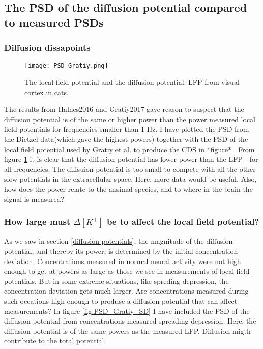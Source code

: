 \documentclass{article}
\begin{document}
\subsection{The PSD of the diffusion potential compared to measured PSDs}
\subsubsection{Diffusion dissapoints}

\begin{figure}
  \texttt{[image: PSD\_Gratiy.png]}
  \caption{The local field potential and the diffusion potential. LFP from visual cortex in cats.}
  \label{fig:PSD_Gratiy}
\end{figure}

The results from Halnes2016 and Gratiy2017 gave reason to suspect that the diffusion potential is of the same or higher power than the power measured local field potentials for frequencies smaller than 1 Hz. I have plotted the PSD from the Dietzel data(which gave the highest powers) together with the PSD of the local field potential used by Gratiy et al. to produce the CDS in *figure* . From figure \ref{fig:PSD_Gratiy} it is clear that the diffusion potential has lower power than the LFP  - for all frequencies. The diffsuion potential is too small to compete with all the other slow potentials in the extracellular space. Here, more data would be useful. Also, how does the power relate to the ansimal species, and to where in the brain the signal is measured?
\subsubsection{How large must $\Delta [K^+]$ be to affect the local field potential?}
As we saw in section \ref{diffusion potentials}, the magnitude of the diffusion potential, and thereby its power, is determined by the initial concentration deviation. Concentrations measured in normal neural activity were not high enough to get at powers as large as those we see in measurements of local field potentials. But in some extreme situations, like spreding depression, the concentration deviation gets much larger. Are concentrations measured during such occations high enough to produse a diffusion potential that can affect measurements? In figure \ref{fig:PSD_Gratiy_SD} I have included the PSD of the diffusion potential from concentrations measured spreading depression. Here, the diffusion potential is of the same powers as the measured  LFP. Diffusion migth contribute to the total potential. 
\end{document}
